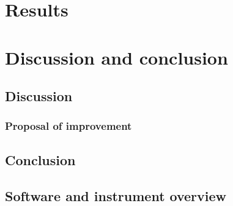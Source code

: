 \documentclass[english, 12pt, a4paper]{article}
\begin{document}
\chapter{Results} 
\chapter{Discussion and conclusion}
\section{Discussion}
\subsection{Proposal of improvement}
\section{Conclusion}



\begin{appendices}
\chapter{Software and instrument overview}
\end{appendices}

\printbibliography{}
\end{document}
